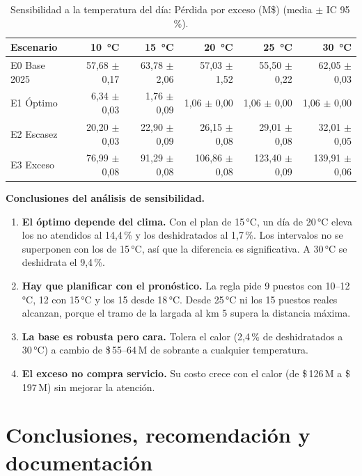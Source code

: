 \documentclass[11pt,a4paper]{article}
\begin{document}
\begin{table}[H]
\centering
\small
\begin{tabular}{lrrrrr}
\toprule
\textbf{Escenario} & \textbf{10 \,°C} & \textbf{15 \,°C} & \textbf{20 \,°C} & \textbf{25 \,°C} & \textbf{30 \,°C} \\
\midrule
E0 Base 2025 & 57,68 $\pm$ 0,17 & 63,78 $\pm$ 2,06 & 57,03 $\pm$ 1,52 & 55,50 $\pm$ 0,22 & 62,05 $\pm$ 0,03 \\
E1 Óptimo & 6,34 $\pm$ 0,03 & 1,76 $\pm$ 0,09 & 1,06 $\pm$ 0,00 & 1,06 $\pm$ 0,00 & 1,06 $\pm$ 0,00 \\
E2 Escasez & 20,20 $\pm$ 0,03 & 22,90 $\pm$ 0,09 & 26,15 $\pm$ 0,08 & 29,01 $\pm$ 0,08 & 32,01 $\pm$ 0,05 \\
E3 Exceso & 76,99 $\pm$ 0,08 & 91,29 $\pm$ 0,08 & 106,86 $\pm$ 0,08 & 123,40 $\pm$ 0,09 & 139,91 $\pm$ 0,06 \\
\bottomrule
\end{tabular}
\caption{Sensibilidad a la temperatura del día: Pérdida por exceso (M\$) (media $\pm$ IC 95\,\%).}
\label{tab:sens-prdidaporexc}
\end{table}



\textbf{Conclusiones del análisis de sensibilidad.}
\begin{enumerate}
    \item \textbf{El óptimo depende del clima.} Con el plan de 15\,°C, un día de 20\,°C eleva los no atendidos al 14,4\,\% y los deshidratados al 1,7\,\%. Los intervalos no se superponen con los de 15\,°C, así que la diferencia es significativa. A 30\,°C se deshidrata el 9,4\,\%.
    \item \textbf{Hay que planificar con el pronóstico.} La regla pide 9 puestos con 10--12\,°C, 12 con 15\,°C y los 15 desde 18\,°C. Desde 25\,°C ni los 15 puestos reales alcanzan, porque el tramo de la largada al km 5 supera la distancia máxima.
    \item \textbf{La base es robusta pero cara.} Tolera el calor (2,4\,\% de deshidratados a 30\,°C) a cambio de \$\,55--64\,M de sobrante a cualquier temperatura.
    \item \textbf{El exceso no compra servicio.} Su costo crece con el calor (de \$\,126\,M a \$\,197\,M) sin mejorar la atención.
\end{enumerate}

\section{Conclusiones, recomendación y documentación}
\end{document}
